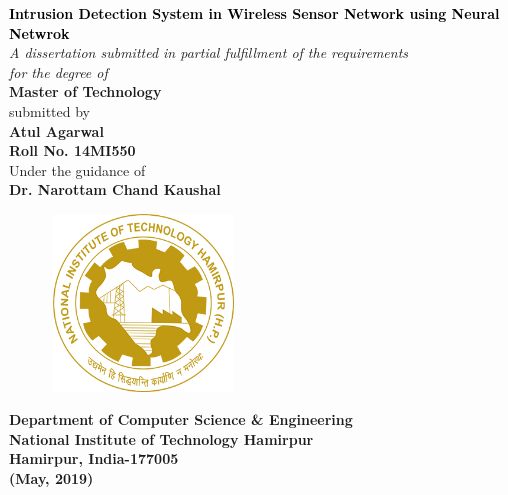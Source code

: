 \thispagestyle{empty}
\graphicspath{{Figures/PNG/}{Figures/}}
\begin{center}
	\vspace{8mm}
	\Large \textcolor{black}{\textbf{Intrusion Detection System in Wireless Sensor Network using Neural Netwrok}}\\
	\vspace{10mm}
	\large \textit{A dissertation submitted in partial fulfillment of the requirements \\ for the degree of} \\
	\vspace{8mm}
	\Large {\textbf{Master of Technology}} \\
    \vspace{8mm}
    \large submitted by \\
    \vspace{8mm}
	\textbf{{\Large Atul Agarwal} \\ {\large Roll No. 14MI550}} \\
	\vspace{6mm}
	\large Under the guidance of \\
	\Large \textbf{Dr. Narottam Chand Kaushal}
	\vspace{5mm}
	\begin{figure}[h!]
		\centering
		\includegraphics[height=4.7cm,width=5cm]{NIT-Logo.png}
	\end{figure}
	\par\vspace{5mm}
	\large \textbf{Department of Computer Science \& Engineering\\
			National Institute of Technology Hamirpur\\
			Hamirpur, India-177005 \\
			(May, 2019)}
\end{center}
\thispagestyle{empty}
